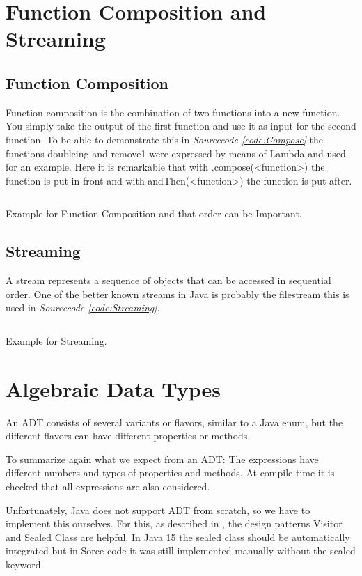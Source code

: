 \documentclass[a4paper,12pt,twoside]{scrreprt}
\begin{document}
\section{Function Composition and Streaming}
\subsection{Function Composition}
Function composition is the combination of two functions into a new function. You simply take the output of the first function and use it as input for the second function. To be able to demonstrate this in \emph{Sourcecode \ref{code:Compose}} the functions doubleing and remove1 were expressed by means of Lambda and used for an example. Here it is remarkable that with .compose(<function>) the function is put in front and with andThen(<function>) the function is put after.
\begin{listing}[ht]
    \inputminted[fontsize=\footnotesize,linenos]{java}{./code/FunctionComposition.java}
    \caption[Example for Function Composition]{Example for Function Composition and that order can be Important.}
    \label{code:Compose}
\end{listing}
\clearpage

\subsection{Streaming}
A stream represents a sequence of objects that can be accessed in sequential order.
One of the better known streams in Java is probably the filestream this is used in \emph{Sourcecode \ref{code:Streaming}}.
\begin{listing}[ht]
    \inputminted[fontsize=\footnotesize,linenos]{java}{./code/Streaming.java}
    \caption[Example for Streaming]{Example for Streaming.}
    \label{code:Streaming}
\end{listing}
\clearpage
\section{Algebraic Data Types}
An \ac{ADT} consists of several variants or flavors, similar to a Java enum, but the different flavors can have different properties or methods.

To summarize again what we expect from an \ac{ADT}:
The expressions have different numbers and types of properties and methods.
At compile time it is checked that all expressions are also considered.

Unfortunately, Java does not support ADT from scratch, so we have to implement this ourselves. For this, as described in \cite{MAINIERO_algebraic_2020}, the design patterns Visitor and Sealed Class are helpful. In Java 15 the sealed class should be automatically integrated but in Sorce code it was still implemented manually without the sealed keyword.
\end{document}
